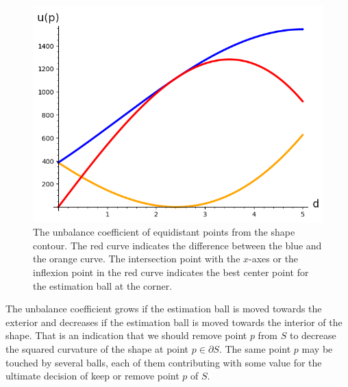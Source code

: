 \begin{figure}[h!]
\begin{minipage}{0.25\textwidth}
\end{minipage}%
\begin{minipage}{0.75\textwidth}
\includegraphics[scale=0.75]{figures/chapter7/unbalance-coefficient-p2-with-sum.png}
\end{minipage}
\caption{The unbalance coefficient of equidistant points from the shape contour. The red curve indicates the difference between the blue and the orange curve. The intersection point with the $x$-axes or the inflexion point in the red curve indicates the best center point for the estimation ball at the corner. }
\label{fig:unbalance-plot}
\end{figure}


The unbalance coefficient grows if the estimation ball is moved towards the exterior and decreases if the estimation ball is moved towards the interior of the shape. That is an indication that we should remove point $p$ from $S$ to decrease the squared curvature of the shape at point $p \in \partial S$. The same point $p$ may be touched by several balls, each of them contributing with some value for the ultimate decision of keep or remove point $p$ of $S$. 


